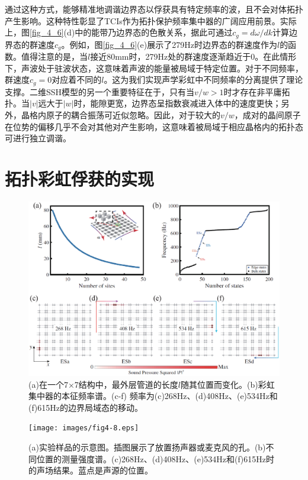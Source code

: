 通过这种方式，能够精准地调谐边界态以俘获具有特定频率的波，且不会对体拓扑产生影响。这种特性彰显了TCIs作为拓扑保护频率集中器的广阔应用前景。实际上，图\ref{fig_4_6}(d)中的能带乃边界态的色散关系，据此可通过$c_g = d\omega/dk$计算边界态的群速度$c_g$。例如，图\ref{fig_4_6}(e)展示了279Hz时边界态的群速度作为$l$的函数。值得注意的是，当$l$接近80mm时，279Hz处的群速度逐渐趋近于0。在此情形下，声波处于驻波状态，这意味着声波的能量被局域于特定位置。对于不同频率，群速度$c_g = 0$对应着不同的$l$。这为我们实现声学彩虹中不同频率的分离提供了理论支撑。二维SSH模型的另一个重要特征在于，只有当$v/w > 1$时才存在非平庸拓扑。当$|v|$远大于$|w|$时，能隙更宽，边界态呈指数衰减进入体中的速度更快；另外，晶格内原子的耦合振荡可近似忽略。因此，对于较大的$v/w$，成对的晶间原子在位势的偏移几乎不会对其他对产生影响，这意味着被局域于相应晶格内的拓扑态可进行独立调谐。

\section{拓扑彩虹俘获的实现}

\begin{figure}[h!]
    \centering
    \includegraphics[width=1\textwidth]{images/fig4-7.eps} 
    \caption{(a)在一个7×7结构中，最外层管道的长度$l$随其位置而变化。(b)彩虹集中器的本征频率谱。(c-f) 频率为(c)268Hz、(d)408Hz、(e)534Hz和(f)615Hz的边界局域态的移动。}
    \label{fig_4_7}
\end{figure} 

\begin{figure}[h!]
    \centering
    \texttt{[image: images/fig4-8.eps]} 
    \caption{(a)实验样品的示意图。插图展示了放置扬声器或麦克风的孔。(b)不同位置的测量强度谱。(c)268Hz、(d)408Hz、(e)534Hz和(f)615Hz时的声场结果。蓝点是声源的位置。}
    \label{fig_4_8}
\end{figure} 


